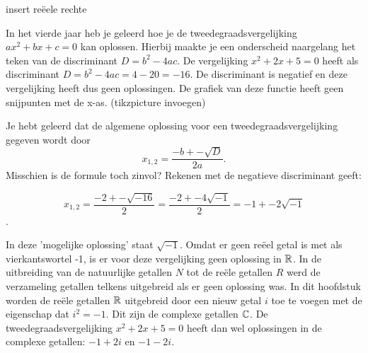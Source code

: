 \documentclass{ximera}
\begin{document}
\begin{image}[0.7\textwidth]
\end{image}    


insert reëele rechte 




In het vierde jaar heb je geleerd hoe je de tweedegraadsvergelijking \(ax^2 + bx + c = 0\) kan oplossen. 
Hierbij maakte je een onderscheid naargelang het teken van de discriminant \(D = b^2 - 4ac\).
De vergelijking \(x^2 + 2x + 5 = 0\) heeft als discriminant \(D = b^2 - 4ac = 4 - 20 = -16\). 
De discriminant is negatief en deze vergelijking heeft dus geen oplossingen. 
De grafiek van deze functie heeft geen snijpunten met de x-as. (tikzpicture invoegen)

Je hebt geleerd dat de algemene oplossing voor een tweedegraadsvergelijking gegeven wordt door 
\[  
    x_{1,2} = \frac{-b +- \sqrt{D}}{2a}. 
\]
Misschien is de formule toch zinvol? Rekenen met de negatieve discriminant geeft:

\[ x_{1,2} = \frac{-2 +- \sqrt{-16}}{2} = \frac{-2 +- 4\sqrt{-1}}{2} = -1 +- 2\sqrt{-1}\]. 

In deze 'mogelijke oplossing' staat \(\sqrt{-1}\). Omdat er geen reëel getal is met als vierkantswortel -1, is er voor deze vergelijking geen oplossing in \(\mathbb{R}\). In de uitbreiding van de natuurlijke getallen \(N\) tot de reële getallen \(R\) werd de verzameling getallen telkens uitgebreid als er geen oplossing was. In dit hoofdstuk worden de reële getallen \(\mathbb{R}\) uitgebreid door een nieuw getal \(i\) toe te voegen met de eigenschap dat \(i^2 = -1\). Dit zijn de complexe getallen \(\mathbb{C}\). De tweedegraadsvergelijking \(x^2 + 2x + 5 = 0\) heeft dan wel oplossingen in de complexe getallen: \(-1 + 2i\)  en  \(-1-2i\).
\end{document}
